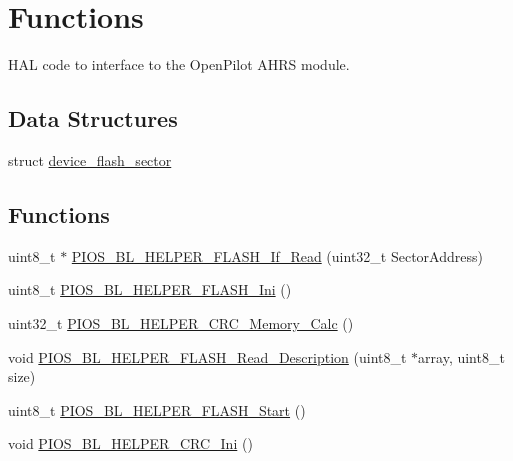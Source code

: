 \hypertarget{group___p_i_o_s___b_o_o_t_l_o_a_d_e_r}{\section{\-Functions}
\label{group___p_i_o_s___b_o_o_t_l_o_a_d_e_r}
}


\-H\-A\-L code to interface to the \-Open\-Pilot \-A\-H\-R\-S module.  


\subsection*{\-Data \-Structures}
\begin{DoxyCompactItemize}
\item 
struct \hyperlink{structdevice__flash__sector}{device\-\_\-flash\-\_\-sector}
\end{DoxyCompactItemize}
\subsection*{\-Functions}
\begin{DoxyCompactItemize}
\item 
uint8\-\_\-t $\ast$ \hyperlink{group___p_i_o_s___b_o_o_t_l_o_a_d_e_r_ga53c23d275b9ef4d15f2cc3df97092b05}{\-P\-I\-O\-S\-\_\-\-B\-L\-\_\-\-H\-E\-L\-P\-E\-R\-\_\-\-F\-L\-A\-S\-H\-\_\-\-If\-\_\-\-Read} (uint32\-\_\-t \-Sector\-Address)
\item 
uint8\-\_\-t \hyperlink{group___p_i_o_s___b_o_o_t_l_o_a_d_e_r_gac6a1eb4bf2d43b88e7731be922624df5}{\-P\-I\-O\-S\-\_\-\-B\-L\-\_\-\-H\-E\-L\-P\-E\-R\-\_\-\-F\-L\-A\-S\-H\-\_\-\-Ini} ()
\item 
uint32\-\_\-t \hyperlink{group___p_i_o_s___b_o_o_t_l_o_a_d_e_r_ga240c1399625e423704a60b750df9f536}{\-P\-I\-O\-S\-\_\-\-B\-L\-\_\-\-H\-E\-L\-P\-E\-R\-\_\-\-C\-R\-C\-\_\-\-Memory\-\_\-\-Calc} ()
\item 
void \hyperlink{group___p_i_o_s___b_o_o_t_l_o_a_d_e_r_gacebd42fb8e03fb132f6970e60f79d1d6}{\-P\-I\-O\-S\-\_\-\-B\-L\-\_\-\-H\-E\-L\-P\-E\-R\-\_\-\-F\-L\-A\-S\-H\-\_\-\-Read\-\_\-\-Description} (uint8\-\_\-t $\ast$array, uint8\-\_\-t size)
\item 
uint8\-\_\-t \hyperlink{group___p_i_o_s___b_o_o_t_l_o_a_d_e_r_ga476de40b81c2052e8973faafeeee358c}{\-P\-I\-O\-S\-\_\-\-B\-L\-\_\-\-H\-E\-L\-P\-E\-R\-\_\-\-F\-L\-A\-S\-H\-\_\-\-Start} ()
\item 
void \hyperlink{group___p_i_o_s___b_o_o_t_l_o_a_d_e_r_ga3de0744595a09bee80a7bd16dfc3a6bc}{\-P\-I\-O\-S\-\_\-\-B\-L\-\_\-\-H\-E\-L\-P\-E\-R\-\_\-\-C\-R\-C\-\_\-\-Ini} ()
\end{DoxyCompactItemize}
